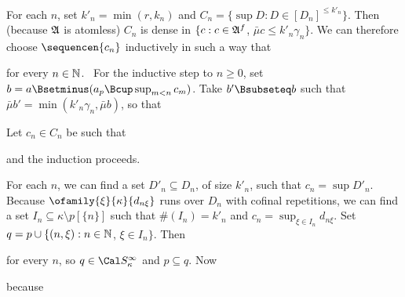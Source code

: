 {For each $n$, set $k'_n=\min(r,k_n)$ and
$C_n=\{\sup D:D\in[D_n]^{\le k'_n}\}$.
Then (because $\frak A$ is atomless) $C_n$ is dense in
$\{c:c\in\frak A^f$, $\bar\mu c\le k'_n\gamma_n\}$.   We can therefore
choose $\sequencen{c_n}$ inductively in such a way that



\noindent for every $n\in\Bbb N$.   \Prf\
For the inductive step to $n\ge 0$, set
$b=a\Bsetminus(a_p\Bcup\sup_{m<n}c_m)$.   Take $b'\Bsubseteq b$ such that
$\bar\mu b'=\min(k'_n\gamma_n,\bar\mu b)$, so that



\noindent Let $c_n\in C_n$ be such that



\noindent and the induction proceeds.\ \Qed

For each $n$, we can find a set $D'_n\subseteq D_n$, of size $k'_n$,
such that $c_n=\sup D'_n$.   Because $\ofamily{\xi}{\kappa}{d_{n\xi}}$
runs over $D_n$ with cofinal repetitions, we can find a set
$I_n\subseteq\kappa\setminus p[\{n\}]$ such that $\#(I_n)=k'_n$ and
$c_n=\sup_{\xi\in I_n}d_{n\xi}$.   Set
$q=p\cup\{(n,\xi):n\in\Bbb N$, $\xi\in I_n\}$.   Then


\noindent for every $n$, so $q\in\Cal S_{\kappa}^{\infty}$ and
$p\subseteq q$.    Now


\noindent because


}
